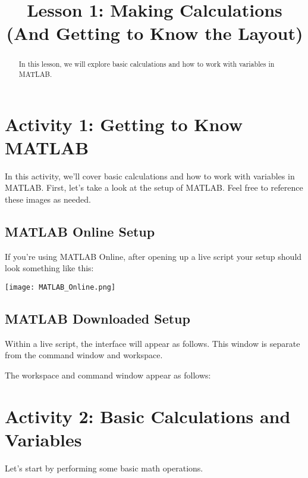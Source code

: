 \documentclass{ximera}
\title{Lesson 1: Making Calculations (And Getting to Know the Layout)}
\begin{document}
\begin{abstract}
In this lesson, we will explore basic calculations and how to work with variables in MATLAB.
\end{abstract}

\section*{Activity 1: Getting to Know MATLAB}

In this activity, we'll cover basic calculations and how to work with variables in MATLAB. 
First, let's take a look at the setup of MATLAB. Feel free to reference these images as needed.

\subsection*{MATLAB Online Setup}

If you're using MATLAB Online, after opening up a live script your setup should look something like this:

\begin{center}
    \texttt{[image: MATLAB\_Online.png]}
\end{center}

\subsection*{MATLAB Downloaded Setup}

Within a live script, the interface will appear as follows. This window is separate from the command window and workspace.


The workspace and command window appear as follows:


\section*{Activity 2: Basic Calculations and Variables}

Let's start by performing some basic math operations. 
\end{document}
